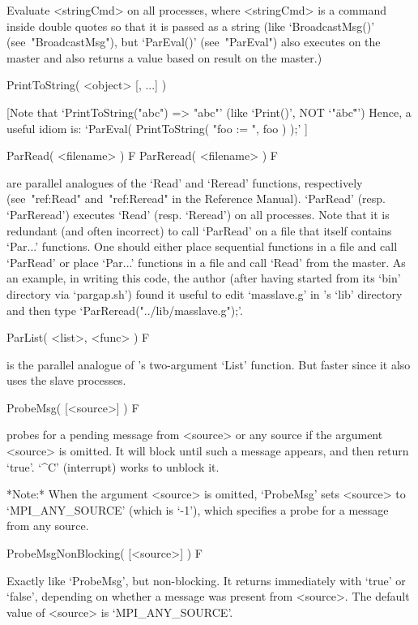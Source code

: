 Evaluate <stringCmd> on all processes, where  <stringCmd>  is  a  command
inside  double  quotes  so  that  it  is  passed  as   a   string   (like
`BroadcastMsg()' (see~"BroadcastMsg"),  but  `ParEval()'  (see~"ParEval")
also executes on the master and also returns a value based on  result  on
the master.)

\>PrintToString( <object> [, ...] )

   [Note that `PrintToString("abc") => "abc"' 
    (like `Print()', NOT `"\"abc\""')
     Hence, a useful idiom is:  `ParEval( PrintToString( "foo := ", foo ) );'  ]

\>ParRead( <filename> ) F
\>ParReread( <filename> ) F

are parallel analogues of  the  {\GAP}  `Read'  and  `Reread'  functions,
respectively (see~"ref:Read" and~"ref:Reread" in the  Reference  Manual).
`ParRead' (resp. `ParReread') executes `Read'  (resp.  `Reread')  on  all
processes. Note that it  is  redundant  (and  often  incorrect)  to  call
`ParRead' on a file that itself contains `Par...' functions.  One  should
either place sequential functions in a file and call `ParRead'  or  place
`Par...' functions in a file and call  `Read'  from  the  master.  As  an
example, in writing this code, the author (after having started {\ParGAP}
from its `bin'  directory  via  `pargap.sh')  found  it  useful  to  edit
`masslave.g'   in   {\ParGAP}'s   `lib'   directory   and    then    type
`ParReread("../lib/masslave.g");'.

\>ParList( <list>, <func> ) F

is the parallel analogue of {\GAP}'s two-argument  `List'  function.  But
faster since it also uses the slave processes.

\>ProbeMsg( [<source>] ) F

probes for a pending message from <source> or any source if the  argument
<source> is omitted. It will block until such a message appears, and then
return `true'. `^C' (interrupt) works to unblock it.

*Note:*
When the argument  <source>  is  omitted,  `ProbeMsg'  sets  <source>  to
`MPI_ANY_SOURCE' (which is `-1'), which specifies a probe for  a  message
from any source.

\>ProbeMsgNonBlocking( [<source>] ) F

Exactly like `ProbeMsg', but non-blocking. It  returns  immediately  with
`true' or `false', depending  on  whether  a  message  was  present  from
<source>. The default value of <source> is `MPI_ANY_SOURCE'.

